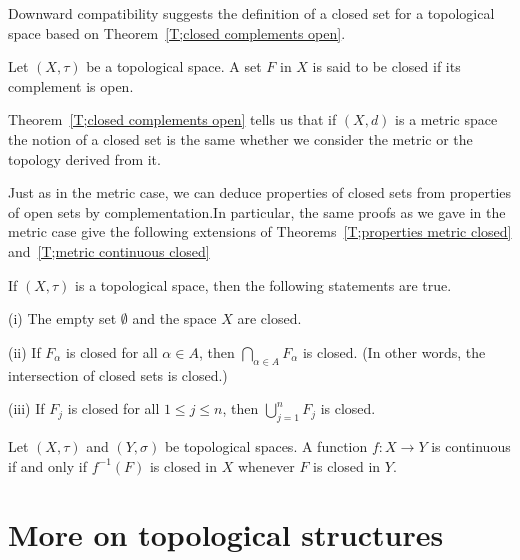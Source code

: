 Downward compatibility suggests the definition of a closed
set for a topological space based on
Theorem~\ref{T;closed complements open}.
\begin{definition}\label{D;closed topologically}
Let $(X,\tau)$ be a topological space. A set $F$ in $X$
is said to be closed if its complement is open.
\end{definition}
Theorem~\ref{T;closed complements open} tells us that
if $(X,d)$ is a metric space the notion
of a closed set is the same
whether we consider the metric or the topology derived
from it.

Just as in the metric case, we can
deduce properties of closed sets from properties of open sets
by complementation.In particular, the same proofs as we
gave in the metric case give the following extensions of
Theorems~\ref{T;properties metric closed}
and~\ref{T;metric continuous closed}
\begin{theorem}
If $(X,\tau)$ is a topological space,
then the following statements are true.

(i) The empty set $\emptyset$ and the space $X$ are closed.

(ii) If $F_{\alpha}$ is closed for all $\alpha\in A$, then
$\bigcap_{\alpha\in A} F_{\alpha}$ is closed. (In other words,
the intersection of closed sets is closed.)

(iii) If $F_{j}$ is closed for all $1\leq j\leq n$, then
$\bigcup_{j=1}^{n} F_{j}$ is closed.
\end{theorem}
\begin{theorem}
Let $(X,\tau)$ and $(Y,\sigma)$
be topological spaces.
A function $f:X\rightarrow Y$ is continuous if and only
if $f^{-1}(F)$ is closed in $X$ whenever $F$ is closed in $Y$.
\end{theorem}















\section{More on topological structures}


